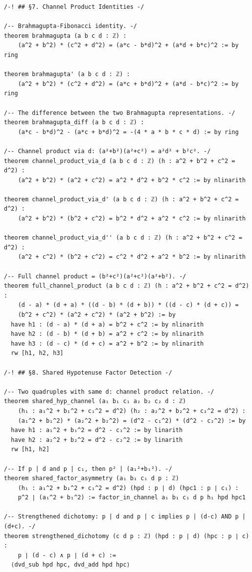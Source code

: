 \documentclass[11pt,openany]{book}
\theoremstyle{definition}
\theoremstyle{plain}
\theoremstyle{remark}
\begin{document}
\begin{lstlisting}[style=lean]
/-! ## §7. Channel Product Identities -/

/-- Brahmagupta-Fibonacci identity. -/
theorem brahmagupta (a b c d : ℤ) :
    (a^2 + b^2) * (c^2 + d^2) = (a*c - b*d)^2 + (a*d + b*c)^2 := by ring

theorem brahmagupta' (a b c d : ℤ) :
    (a^2 + b^2) * (c^2 + d^2) = (a*c + b*d)^2 + (a*d - b*c)^2 := by ring

/-- The difference between the two Brahmagupta representations. -/
theorem brahmagupta_diff (a b c d : ℤ) :
    (a*c - b*d)^2 - (a*c + b*d)^2 = -(4 * a * b * c * d) := by ring

/-- Channel product via d: (a²+b²)(a²+c²) = a²d² + b²c². -/
theorem channel_product_via_d (a b c d : ℤ) (h : a^2 + b^2 + c^2 = d^2) :
    (a^2 + b^2) * (a^2 + c^2) = a^2 * d^2 + b^2 * c^2 := by nlinarith

theorem channel_product_via_d' (a b c d : ℤ) (h : a^2 + b^2 + c^2 = d^2) :
    (a^2 + b^2) * (b^2 + c^2) = b^2 * d^2 + a^2 * c^2 := by nlinarith

theorem channel_product_via_d'' (a b c d : ℤ) (h : a^2 + b^2 + c^2 = d^2) :
    (a^2 + c^2) * (b^2 + c^2) = c^2 * d^2 + a^2 * b^2 := by nlinarith

/-- Full channel product = (b²+c²)(a²+c²)(a²+b²). -/
theorem full_channel_product (a b c d : ℤ) (h : a^2 + b^2 + c^2 = d^2) :
    (d - a) * (d + a) * ((d - b) * (d + b)) * ((d - c) * (d + c)) =
    (b^2 + c^2) * (a^2 + c^2) * (a^2 + b^2) := by
  have h1 : (d - a) * (d + a) = b^2 + c^2 := by nlinarith
  have h2 : (d - b) * (d + b) = a^2 + c^2 := by nlinarith
  have h3 : (d - c) * (d + c) = a^2 + b^2 := by nlinarith
  rw [h1, h2, h3]

/-! ## §8. Shared Hypotenuse Factor Detection -/

/-- Two quadruples with same d: channel product relation. -/
theorem shared_hyp_channel (a₁ b₁ c₁ a₂ b₂ c₂ d : ℤ)
    (h₁ : a₁^2 + b₁^2 + c₁^2 = d^2) (h₂ : a₂^2 + b₂^2 + c₂^2 = d^2) :
    (a₁^2 + b₁^2) * (a₂^2 + b₂^2) = (d^2 - c₁^2) * (d^2 - c₂^2) := by
  have h1 : a₁^2 + b₁^2 = d^2 - c₁^2 := by linarith
  have h2 : a₂^2 + b₂^2 = d^2 - c₂^2 := by linarith
  rw [h1, h2]

/-- If p | d and p | c₁, then p² | (a₁²+b₁²). -/
theorem shared_factor_asymmetry (a₁ b₁ c₁ d p : ℤ)
    (h₁ : a₁^2 + b₁^2 + c₁^2 = d^2) (hpd : p ∣ d) (hpc1 : p ∣ c₁) :
    p^2 ∣ (a₁^2 + b₁^2) := factor_in_channel a₁ b₁ c₁ d p h₁ hpd hpc1

/-- Strengthened dichotomy: p | d and p | c implies p | (d-c) AND p | (d+c). -/
theorem strengthened_dichotomy (c d p : ℤ) (hpd : p ∣ d) (hpc : p ∣ c) :
    p ∣ (d - c) ∧ p ∣ (d + c) :=
  ⟨dvd_sub hpd hpc, dvd_add hpd hpc⟩


\end{lstlisting}
\end{document}
